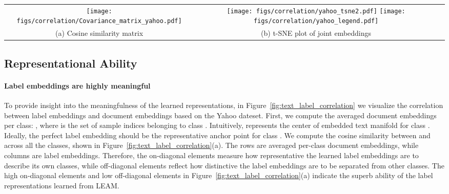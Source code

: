 \documentclass[11pt,a4paper]{article}
\begin{document}
\begin{figure*}[t!] \centering
	\vspace{-0mm}
	\begin{tabular}{ccc}		
		\texttt{[image: figs/correlation/Covariance\_matrix\_yahoo.pdf]} & \hspace{-5mm}
		\texttt{[image: figs/correlation/yahoo\_tsne2.pdf]} 
		\texttt{[image: figs/correlation/yahoo\_legend.pdf]} 
		\\
		\hspace{-5mm}
		(a) Cosine similarity matrix \vspace{0mm}  & 
		\hspace{-15mm}
		(b) t-SNE plot of joint embeddings \hspace{-0mm}& 
	\end{tabular}
	\vspace{-2mm}
	\caption{Correlation between the learned text sequence representation  and label embedding . (a) Cosine similarity matrix between averaged  per class  and label embedding , and (b) t-SNE plot of joint embedding of text  and labels . }
	\vspace{-2mm}
	\label{fig:text_label_correlation}
\end{figure*}


\subsection{Representational Ability}
\paragraph{Label embeddings are highly meaningful} 
To provide insight into the meaningfulness of the learned representations, in Figure~\ref{fig:text_label_correlation} we  visualize the correlation between label embeddings and document embeddings based on the Yahoo dateset. First, we compute the averaged document embeddings per class: 
, 
where  is the set of sample indices  belonging to class . Intuitively,  represents the center of embedded text manifold for class . Ideally, the perfect label embedding  should be the representative anchor point for class . We compute the cosine similarity between  and  across all the classes, shown in Figure~\ref{fig:text_label_correlation}(a). The rows are averaged per-class document embeddings, while columns are label embeddings. Therefore, the on-diagonal elements measure how representative the learned label embeddings are to describe its own classes, while off-diagonal elements reflect how distinctive the label embeddings are to be separated from other classes. The high on-diagonal elements and low off-diagonal elements in Figure~\ref{fig:text_label_correlation}(a) indicate the superb ability of the label representations learned from LEAM.
\end{document}
